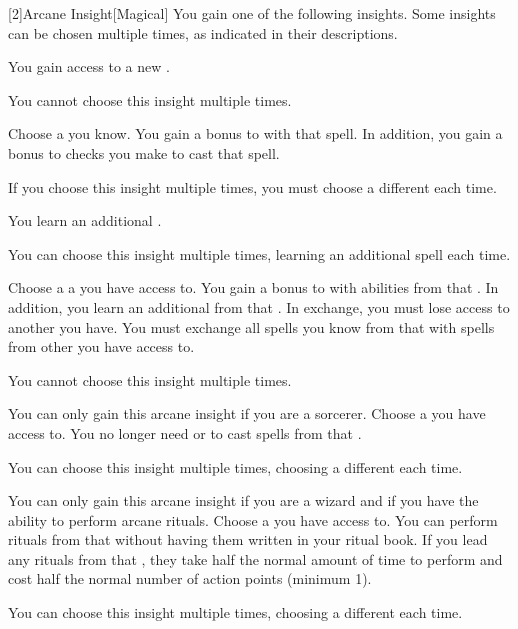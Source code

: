         [2]{Arcane Insight}[Magical]
        You gain one of the following insights.
        Some insights can be chosen multiple times, as indicated in their descriptions.

        {
             You gain access to a new .
            \par You cannot choose this insight multiple times.

             Choose a  you know.
            You gain a  bonus to  with that spell.
            In addition, you gain a  bonus to  checks you make to cast that spell.
            \par If you choose this insight multiple times, you must choose a different  each time.

             You learn an additional .
            \par You can choose this insight multiple times, learning an additional spell each time.

             Choose a a  you have access to.
            You gain a  bonus to  with abilities from that .
            In addition, you learn an additional  from that .
            In exchange, you must lose access to another  you have.
            You must exchange all spells you know from that  with spells from other  you have access to.
            \par You cannot choose this insight multiple times.

             You can only gain this arcane insight if you are a sorcerer.
            Choose a  you have access to.
            You no longer need  or  to cast spells from that .
            \par You can choose this insight multiple times, choosing a different  each time.

             You can only gain this arcane insight if you are a wizard and if you have the ability to perform arcane rituals.
            Choose a  you have access to.
            You can perform rituals from that  without having them written in your ritual book.
            If you lead any rituals from that , they take half the normal amount of time to perform and cost half the normal number of action points (minimum 1).
            \par You can choose this insight multiple times, choosing a different  each time.
        }

